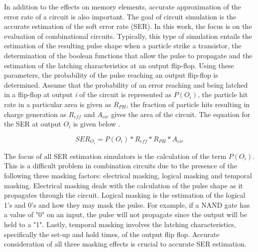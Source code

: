 In addition to the effects on memory elements, accurate approximation of the error rate of a circuit is also important. The goal of circuit simulation is the accurate estimation of the soft error rate (SER). In this work, the focus is on the evaluation of combinational circuits. Typically, this type of simulation entails the estimation of the resulting pulse shape when a particle strike a transistor, the determination of the boolean functions that allow the pulse to propagate and the estimation of the latching characteristics at an output flip-flop. Using these parameters, the probability of the pulse reaching an output flip-flop is determined. Assume that the probability of an error reaching and being latched in a flip-flop at output \textit{i} of the circuit is represented as \textit{$P(O_i)$}, the particle hit rate in a particular area is given as \textit{$R_{PH}$}, the fraction of particle hits resulting in charge generation as \textit{$R_{eff}$} and \textit{$A_{cir}$} gives the area of the circuit. The equation for the SER at output \textit{$O_i$} is given below \cite{METSys}.

\begin{equation}\label{SER_eq}
SER_{O_i} = P(O_i) * R_{eff} * R_{PH} * A_{cir}
\end{equation}

The focus of all SER estimation simulators is the calculation of the term \textit{$P(O_i)$}. This is a difficult problem in combination circuits due to the presence of the following three masking factors: electrical masking, logical masking and temporal masking. Electrical masking deals with the calculation of the pulse shape as it propagates through the circuit. Logical masking is the estimation of the logical 1's and 0's and how they may mask the pulse. For example, if a NAND gate has a value of "0" on an input, the pulse will not propagate since the output will be held to a "1". Lastly, temporal masking involves the latching characteristics, specifically the set-up and hold times, of the output flip flop. Accurate consideration of all three masking effects is crucial to accurate SER estimation.

